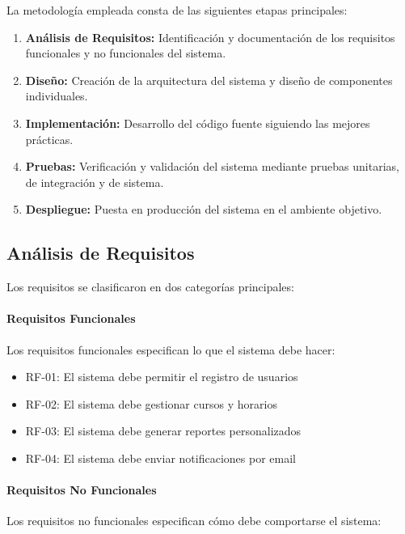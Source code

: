 \documentclass{pt-report}
\begin{document}
La metodología empleada consta de las siguientes etapas principales:

\begin{enumerate}
    \item \textbf{Análisis de Requisitos:} Identificación y documentación de los requisitos funcionales y no funcionales del sistema.
    \item \textbf{Diseño:} Creación de la arquitectura del sistema y diseño de componentes individuales.
    \item \textbf{Implementación:} Desarrollo del código fuente siguiendo las mejores prácticas.
    \item \textbf{Pruebas:} Verificación y validación del sistema mediante pruebas unitarias, de integración y de sistema.
    \item \textbf{Despliegue:} Puesta en producción del sistema en el ambiente objetivo.
\end{enumerate}

\subsection{Análisis de Requisitos}

Los requisitos se clasificaron en dos categorías principales:

\paragraph{Requisitos Funcionales}

Los requisitos funcionales especifican lo que el sistema debe hacer:

\begin{itemize}
    \item RF-01: El sistema debe permitir el registro de usuarios
    \item RF-02: El sistema debe gestionar cursos y horarios
    \item RF-03: El sistema debe generar reportes personalizados
    \item RF-04: El sistema debe enviar notificaciones por email
\end{itemize}

\paragraph{Requisitos No Funcionales}

Los requisitos no funcionales especifican cómo debe comportarse el sistema:
\end{document}
